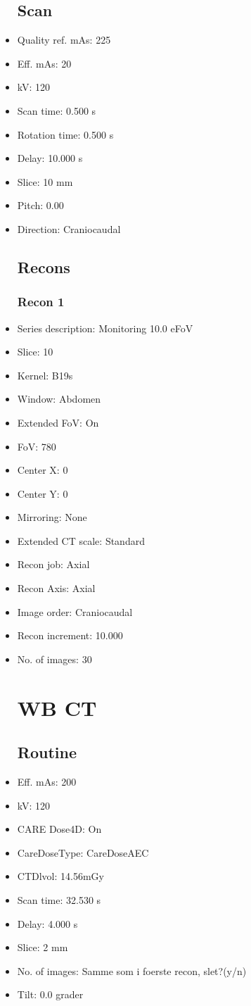 \documentclass[12pt]{article}
\begin{document}
\begin{itemize}
\subsection{Scan}
\item Quality ref. mAs: 225\item Eff. mAs: 20\item kV: 120\item Scan time: 0.500 s\item Rotation time: 0.500 s\item Delay: 10.000 s\item Slice: 10 mm\item Pitch: 0.00\item Direction: Craniocaudal\subsection{Recons}

\subsubsection{Recon 1}
\item Series description: Monitoring 10.0 eFoV
\item Slice: 10
\item Kernel: B19s
\item Window: Abdomen
\item Extended FoV: On
\item FoV: 780
\item Center X: 0
\item Center Y: 0
\item Mirroring: None
\item Extended CT scale: Standard
\item Recon job: Axial
\item Recon Axis: Axial
\item Image order: Craniocaudal
\item Recon increment: 10.000
\item No. of images: 30
\section{WB CT}
\subsection{Routine}
\item Eff. mAs: 200\item kV: 120\item CARE Dose4D: On\item CareDoseType: CareDoseAEC\item CTDlvol: 14.56mGy\item Scan time: 32.530 s\item Delay: 4.000 s\item Slice: 2 mm\item No. of images: Samme som i foerste recon, slet?(y/n)\item Tilt: 0.0 grader

\end{itemize}
\end{document}
